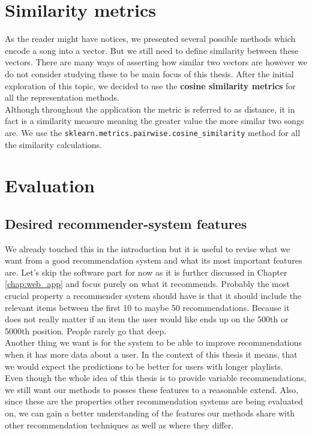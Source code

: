 \section{Similarity metrics}\label{sec:similarity_metrics}
As the reader might have notices, we presented several possible methods which encode a song into a vector. But we still need to define similarity between these vectors. There are many ways of asserting how similar two vectors are however we do not consider studying these to be main focus of this thesis. After the initial exploration of this topic, we decided to use the \textbf{cosine similarity metrics} for all the representation methods. \\
Although throughout the application the metric is referred to as distance, it in fact is a similarity measure meaning the greater value the more similar two songs are. We use the \texttt{sklearn.metrics.pairwise.cosine\_similarity} method for all the similarity calculations.

\section{Evaluation}\label{sec:evaluation}

\subsection{Desired recommender-system features}
We already touched this in the introduction but it is useful to revise what we want from a good recommendation system and what its most important features are. Let's skip the software part for now as it is further discussed in Chapter \ref{chap:web_app} and focus purely on what it recommends. Probably the most crucial property a recommender system should have is that it should include the relevant items between the first 10 to maybe 50 recommendations. Because it does not really matter if an item the user would like ends up on the 500th or 5000th position. People rarely go that deep. \\
Another thing we want is for the system to be able to improve recommendations when it has more data about a user. In the context of this thesis it means, that we would expect the predictions to be better for users with longer playlists. \\
Even though the whole idea of this thesis is to provide variable recommendations, we still want our methods to posses these features to a reasonable extend. Also, since these are the properties other recommendation systems are being evaluated on, we can gain a better understanding of the features our methods share with other recommendation techniques as well as where they differ. 

